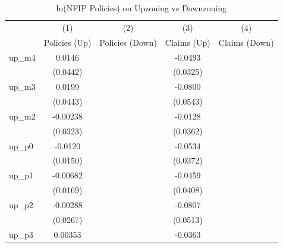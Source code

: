 \begin{table}[htbp]\centering
\def\sym#1{\ifmmode^{#1}\else\(^{#1}\)\fi}
\caption{ln(NFIP Policies) on Upzoning vs Downzoning}
\begin{tabular}{l*{4}{c}}
\hline\hline
                    &\multicolumn{1}{c}{(1)}&\multicolumn{1}{c}{(2)}&\multicolumn{1}{c}{(3)}&\multicolumn{1}{c}{(4)}\\
                    &\multicolumn{1}{c}{Policies (Up)}&\multicolumn{1}{c}{Policies (Down)}&\multicolumn{1}{c}{Claims (Up)}&\multicolumn{1}{c}{Claims (Down)}\\
\hline
up\_m4               &      0.0146         &                     &     -0.0493         &                     \\
                    &    (0.0442)         &                     &    (0.0325)         &                     \\
[1em]
up\_m3               &      0.0199         &                     &     -0.0800         &                     \\
                    &    (0.0443)         &                     &    (0.0543)         &                     \\
[1em]
up\_m2               &    -0.00238         &                     &     -0.0128         &                     \\
                    &    (0.0323)         &                     &    (0.0362)         &                     \\
[1em]
up\_p0               &     -0.0120         &                     &     -0.0534         &                     \\
                    &    (0.0150)         &                     &    (0.0372)         &                     \\
[1em]
up\_p1               &    -0.00682         &                     &     -0.0459         &                     \\
                    &    (0.0169)         &                     &    (0.0408)         &                     \\
[1em]
up\_p2               &    -0.00288         &                     &     -0.0807         &                     \\
                    &    (0.0267)         &                     &    (0.0513)         &                     \\
[1em]
up\_p3               &     0.00353         &                     &     -0.0363         &                     \\

\end{tabular}
\end{table}
